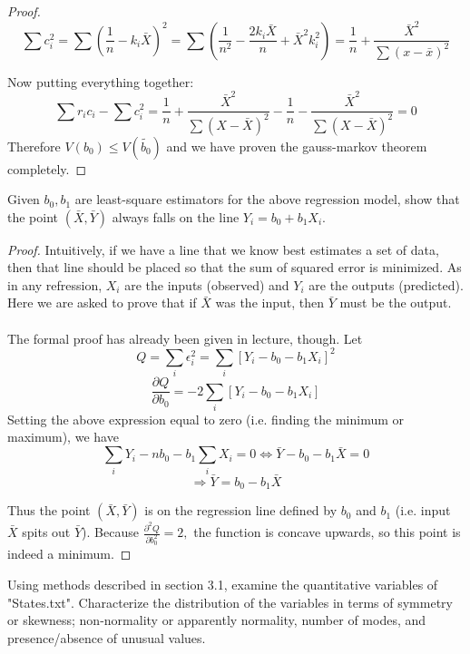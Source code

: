 \documentclass[12pt]{article}
\newenvironment{problem}[2][Problem]{\begin{trivlist}
\item[\hskip \labelsep {\bfseries #1}\hskip \labelsep {\bfseries #2.}]}{\end{trivlist}}
\begin{document}
\begin{proof}
$$\sum c_i^2 = \sum (\frac{1}{n} - k_i \bar{X})^2 = \sum (\frac{1}{n^2} - \frac{2k_i\bar{X}}{n} + \bar{X}^2k_i^2) = \frac{1}{n} + \frac{\bar{X}^2}{\sum(x-\bar{x})^2}$$

Now putting everything together:
$$\sum r_ic_i - \sum c_i^2 = \frac{1}{n} + \frac{\bar{X}^2}{\sum(X-\bar{X})^2} - \frac{1}{n} - \frac{\bar{X}^2}{\sum(X-\bar{X})^2} = 0$$
Therefore $V(b_0) \leq V(\widetilde{b_0})$ and we have proven the gauss-markov theorem completely.
\end{proof}

\begin{problem}{2}
Given $b_0, b_1$ are least-square estimators for the above regression model, show that the point $(\bar{X}, \bar{Y})$ always falls on the line $Y_i = b_0 + b_1X_i.$
\end{problem}

\begin{proof}
Intuitively, if we have a line that we know best estimates a set of data, then that line should be placed so that the sum of squared error is minimized. As in any refression, $X_i$ are the inputs (observed) and $Y_i$ are the outputs (predicted). Here we are asked to prove that if $\bar{X}$ was the input, then $\bar{Y}$ must be the output. \\ 
\\
The formal proof has already been given in lecture, though. Let
$$Q = \sum_i \epsilon_i^2 = \sum_i [Y_i - b_0 - b_1X_i]^2$$
$$\frac{\partial Q}{\partial b_0} = -2\sum_i [Y_i - b_0 - b_1X_i]$$
Setting the above expression equal to zero (i.e. finding the minimum or maximum), we have 
$$\sum_i Y_i - nb_0 - b_1\sum_i X_i = 0 \iff \bar{Y} - b_0 - b_1 \bar{X} = 0$$
$$\Rightarrow \bar{Y}= b_0 - b_1\bar{X}$$

Thus the point $(\bar{X}, \bar{Y})$ is on the regression line defined by $b_0$ and $b_1$ (i.e. input $\bar{X}$ spits out $\bar{Y}$). Because $\frac{\partial^2 Q}{\partial b_0^2} = 2,$ the function is concave upwards, so this point is indeed a minimum. 
\end{proof}

\begin{problem}{4}
Using methods described in section 3.1, examine the quantitative variables of "States.txt". Characterize the distribution of the variables in terms of symmetry or skewness; non-normality or apparently normality, number of modes, and presence/absence of unusual values. 
\end{problem}
\end{document}

